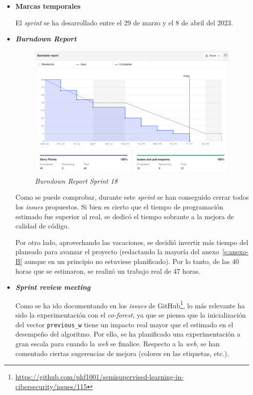 \begin{itemize}
\begin{enumerate}
	\end{enumerate}
	\item \textbf{Marcas temporales}		
	
	El \textit{sprint} se ha desarrollado entre el 29 de marzo y el 8 de abril del 2023.
	
	\item \textbf{\textit{Burndown Report}}
	
		\begin{figure}[h]
		\caption{\textit{Burndown Report Sprint 18}}
		\centering
		\includegraphics[width=\textwidth]{../img/anexos/bdr/s18_bdr}
	\end{figure}

	Como se puede comprobar, durante este \textit{sprint} se han conseguido cerrar todos los \textit{issues} propuestos. Si bien es cierto que el tiempo de programación estimado fue superior al real, se dedicó el tiempo sobrante a la mejora de calidad de código.
	
	Por otro lado, aprovechando las vacaciones, se decidió invertir más tiempo del planeado para avanzar el proyecto (redactando la mayoría del anexo~\ref{s:anexo-B} aunque en un principio no estuviese planificado). Por lo tanto, de las 40 horas que se estimaron, se realizó un trabajo real de 47 horas.


	\item \textbf{\textit{Sprint review meeting}}
	
	Como se ha ido documentando en los \textit{issues} de GitHub\footnote{\url{https://github.com/phf1001/semisupervised-learning-in-cibersecurity/issues/115}}, lo más relevante ha sido la experimentación con el \textit{co-forest}, ya que se piensa que la inicialización del vector \texttt{previous\_w} tiene un impacto real mayor que el estimado en el desempeño del algoritmo. Por ello, se ha planificado una experimentación a gran escala para cuando la \textit{web} se finalice. Respecto a la \textit{web}, se han comentado ciertas sugerencias de mejora (colores en las etiquetas, etc.).
	
\end{itemize}


